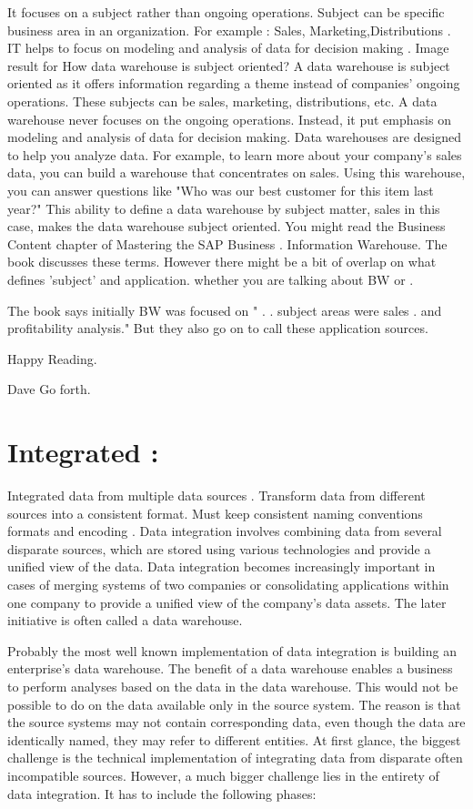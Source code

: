 \documentclass{article}
\begin{document}
 It focuses on a subject rather than ongoing operations. Subject can be specific business area in an organization.   For example : Sales, Marketing,Distributions .
 IT helps to focus on modeling and analysis of data for decision making . Image result for How data warehouse is subject oriented?
A data warehouse is subject oriented as it offers information regarding a theme instead of companies' ongoing operations. These subjects can be sales, marketing, distributions, etc. A data warehouse never focuses on the ongoing operations. Instead, it put emphasis on modeling and analysis of data for decision making.
Data warehouses are designed to help you analyze data. For example, to learn more about your company's sales data, you can build a warehouse that concentrates on sales. Using this warehouse, you can answer questions like "Who was our best customer for this item last year?" This ability to define a data warehouse by subject matter, sales in this case, makes the data warehouse subject oriented.
You might read the Business Content chapter of Mastering the SAP Business .
Information Warehouse. The book discusses these terms. However there 
might be a bit of overlap on what defines 'subject' and application.
whether you are talking about BW or .

The book says initially BW was focused on " . . subject areas were sales .
and profitability analysis." But they also go on to call these 
application sources.

Happy Reading.

Dave Go forth.
 
 
 \newpage
 
 \section{Integrated :}
 
 Integrated data from multiple data sources . Transform data  from different sources into a consistent format.
 Must keep consistent naming conventions formats and encoding .  Data integration involves combining data from several disparate sources, which are stored using various technologies and provide a unified view of the data. Data integration becomes increasingly important in cases of merging systems of two companies or consolidating applications within one company to provide a unified view of the company's data assets. The later initiative is often called a data warehouse.

Probably the most well known implementation of data integration is building an enterprise's data warehouse. The benefit of a data warehouse enables a business to perform analyses based on the data in the data warehouse. This would not be possible to do on the data available only in the source system. The reason is that the source systems may not contain corresponding data, even though the data are identically named, they may refer to different entities.
At first glance, the biggest challenge is the technical implementation of integrating data from disparate often incompatible sources. However, a much bigger challenge lies in the entirety of data integration. It has to include the following phases:
\end{document}
